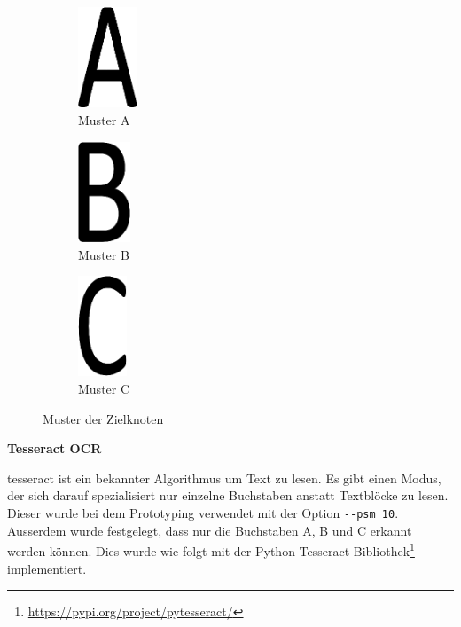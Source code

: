 \begin{figure}[H]
\centering
\begin{subfigure}{0.35\textwidth}
\centering
\includegraphics[height=30mm]{assets/informatik-prototyp/opencv/target_node_detection/a.png} 
\caption{Muster A}
\label{fig:image-a}
\end{subfigure}
\begin{subfigure}{0.2\textwidth}
\centering
\includegraphics[height=30mm]{assets/informatik-prototyp/opencv/target_node_detection/b.png} 
\caption{Muster B}
\label{fig:image-b}
\end{subfigure}
\begin{subfigure}{0.33\textwidth}
\centering
\includegraphics[height=30mm]{assets/informatik-prototyp/opencv/target_node_detection/c.png} 
\caption{Muster C}
\label{fig:image-c}
\end{subfigure}

\caption{Muster der Zielknoten}
\label{fig:muster-zielknoten}
\end{figure}

\textbf{Tesseract OCR}

\gls{tesseract} ist ein bekannter Algorithmus um Text zu lesen. Es gibt einen Modus, der sich darauf spezialisiert nur einzelne Buchstaben anstatt Textblöcke zu lesen. Dieser wurde bei dem Prototyping verwendet mit der Option \verb|--psm 10|. Ausserdem wurde festgelegt, dass nur die Buchstaben A, B und C erkannt werden können. Dies wurde wie folgt mit der Python Tesseract Bibliothek\footnote{\url{https://pypi.org/project/pytesseract/}} implementiert. 

